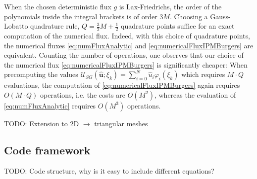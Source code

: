 When the chosen deterministic flux $g$ is Lax-Friedrichs, the order of the polynomials inside the integral brackets is of order $3M$. Choosing a Gauss-Lobatto quadrature rule, $Q = \frac32 M +\frac12$ quadrature points suffice for an exact computation of the numerical flux. Indeed, with this choice of quadrature points, the numerical fluxes \eqref{eq:numFluxAnalytic} and \eqref{eq:numericalFluxIPMBurgers} are equivalent. 
Counting the number of operations, one observes that our choice of the numerical flux \eqref{eq:numericalFluxIPMBurgers} is significantly cheaper: When precomputing the values $\mathcal{U}_{SG}(\bm{\hat u};\xi_k)=\sum_{i=0}^N\hat u_i\varphi_i(\xi_k)$ which requires $M\cdot Q$ evaluations, the computation of \eqref{eq:numericalFluxIPMBurgers} again requires $O(M\cdot Q)$ operations, i.e. the costs are $O(M^2)$, whereas the evaluation of \eqref{eq:numFluxAnalytic} requires $O(M^3)$ operations.

TODO: Extension to 2D $\rightarrow$ triangular meshes

\subsection{Code framework}

TODO: Code structure, why is it easy to include different equations?